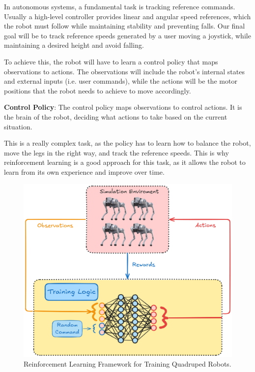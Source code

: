In autonomous systems, a fundamental task is tracking reference commands. Usually a high-level controller provides linear and angular speed references, which the robot must follow while maintaining stability and preventing falls. Our final goal will be to track reference speeds generated by a user moving a joystick, while maintaining a desired height and avoid falling.

To achieve this, the robot will have to learn a control policy that maps observations to actions. The observations will include the robot's internal states and external inputs (i.e. user commands), while the actions will be the motor positions that the robot needs to achieve to move accordingly.

\begin{highlightbox}
	\textbf{Control Policy}: The control policy maps observations to control actions. It is the brain of the robot, deciding what actions to take based on the current situation.
\end{highlightbox}

This is a really complex task, as the policy has to learn how to balance the robot, move the legs in the right way, and track the reference speeds. This is why reinforcement learning is a good approach for this task, as it allows the robot to learn from its own experience and improve over time.

\begin{figure}[!h]
	\centering
	\includegraphics[width=0.5\linewidth]{fig/rl-framework}
	\caption{Reinforcement Learning Framework for Training Quadruped Robots.}
	\label{fig_sim}
\end{figure}
